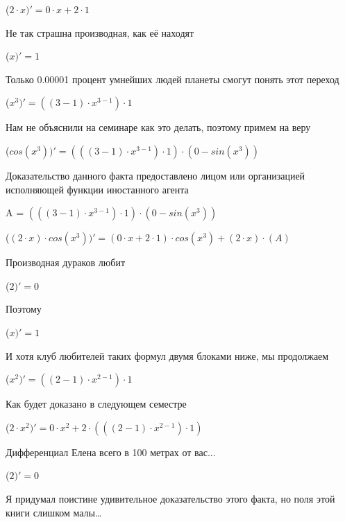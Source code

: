 \documentclass[12pt,a4paper,fleqn]{article}
\begin{document}
\begin{center}
 ($2 \cdot x)'
  = 0 \cdot x+2 \cdot 1$\end{center}
Не так страшна производная, как её находят\cite{link2}

\begin{center}
 ($x)'
  = 1$\end{center}
Только 0.00001 процент умнейших людей планеты смогут понять этот переход

\begin{center}
 ($x^{3})'
  = ((3-1) \cdot x^{3-1}) \cdot 1$\end{center}
Нам не объяснили на семинаре как это делать, поэтому примем на веру

\begin{center}
 ($cos(x^{3}))'
  = (((3-1) \cdot x^{3-1}) \cdot 1) \cdot (0-sin(x^{3}))$\end{center}
Доказательство данного факта предоставлено лицом или организацией исполняющей функции иностанного агента

\begin{center}
A = $(((3-1) \cdot x^{3-1}) \cdot 1) \cdot (0-sin(x^{3}))$\end{center}
\begin{center}
 ($(2 \cdot x) \cdot cos(x^{3}))'
  = (0 \cdot x+2 \cdot 1) \cdot cos(x^{3})+(2 \cdot x) \cdot (A)$\end{center}
Производная дураков любит\cite{link2}

\begin{center}
 ($2)'
  = 0$\end{center}
Поэтому

\begin{center}
 ($x)'
  = 1$\end{center}
И хотя клуб любителей таких формул двумя блоками ниже, мы продолжаем

\begin{center}
 ($x^{2})'
  = ((2-1) \cdot x^{2-1}) \cdot 1$\end{center}
Как будет доказано в следующем семестре

\begin{center}
 ($2 \cdot x^{2})'
  = 0 \cdot x^{2}+2 \cdot (((2-1) \cdot x^{2-1}) \cdot 1)$\end{center}
Дифференциал Елена всего в 100 метрах от вас...

\begin{center}
 ($2)'
  = 0$\end{center}
Я придумал поистине удивительное доказательство этого факта, но поля этой книги слишком малы\ldots
\end{document}
